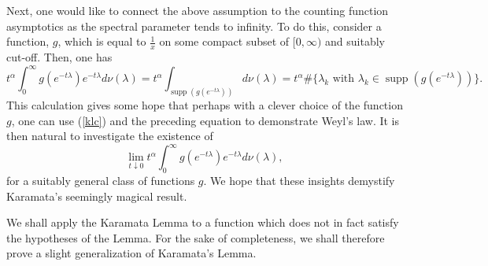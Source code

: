 \documentclass[letterpaper,12pt]{amsart}
\newcommand{\supp}{\mathop{\mathrm{supp}}\nolimits}
\begin{document}
Next, one would like to connect the above assumption to the counting function asymptotics as the spectral parameter tends to infinity.  To do this, consider a function, $g$, which is equal to $\frac{1}{x}$ on some compact subset of $[0, \infty)$ and suitably cut-off.  Then, one has
$$t^\alpha \int_0 ^\infty g(e^{-t\lambda}) e^{-t\lambda} d\nu(\lambda) =t^\alpha  \int_{\supp(g(e^{-t\lambda}))} d\nu(\lambda) = t^{\alpha} \# \{ \lambda_k \textrm{ with } \lambda_k \in \supp(g(e^{-t\lambda})) \}.$$
This calculation gives some hope that perhaps with a clever choice of the function $g$, one can use (\ref{klc}) and the  preceding equation to demonstrate Weyl's law.  It is then natural to investigate the existence of
$$\lim_{t \downarrow 0} t^\alpha \int_0 ^\infty g(e^{-t\lambda}) e^{-t\lambda} d\nu(\lambda),$$
for a suitably general class of functions $g$.  We hope that these insights demystify Karamata's seemingly magical result.

We shall apply the Karamata Lemma to a function which does not in fact satisfy the hypotheses of the Lemma.  For the sake of completeness, we shall therefore prove a slight generalization of Karamata's Lemma.
\end{document}
